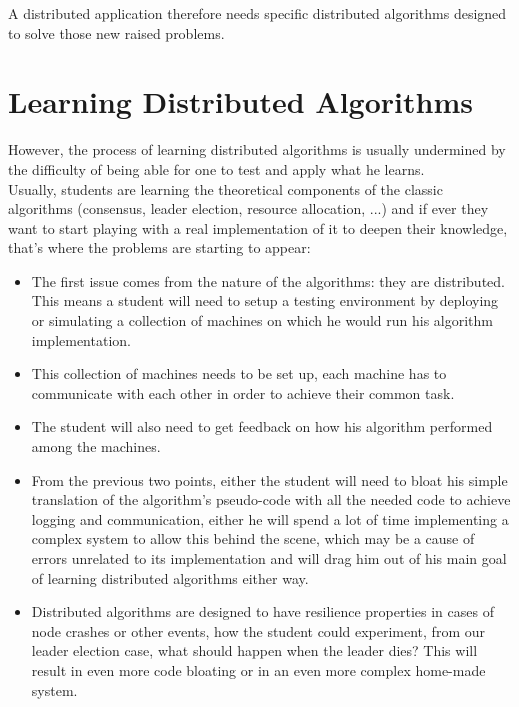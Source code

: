 \documentclass{eplmastersthesis}
\begin{document}
    A distributed application therefore needs specific distributed algorithms
    designed to solve those new raised problems.

    \section{Learning Distributed Algorithms}

      However, the process of learning distributed algorithms
      is usually undermined by the difficulty of being able for one to test
      and apply what he learns.\\
      Usually, students are learning the theoretical components of the
      classic algorithms (consensus, leader election, resource allocation, ...)
      and if ever they want to start playing with a real implementation of it
      to deepen their knowledge, that's where the problems are starting to
      appear:

      \begin{itemize}
        \item The first issue comes from the nature of the algorithms: they are
        distributed. This means a student will need to setup a testing
        environment by deploying or simulating a collection of machines on
        which he would run his algorithm implementation.
        \item This collection of machines needs to be set up, each machine has
        to communicate with each other in order to achieve their common task.
        \item The student will also need to get feedback on how his
        algorithm performed among the machines.
        \item From the previous two points, either the student will need to
        bloat his simple translation of the algorithm's pseudo-code
        with all the needed code to achieve logging and communication, either
        he will spend a lot of time implementing a complex system to allow
        this behind the scene, which may be a cause of errors unrelated to its
        implementation and will drag him out of his main goal of learning
        distributed algorithms either way.
        \item Distributed algorithms are designed to have resilience
        properties in cases of node crashes or other events, how the student
        could experiment, from our leader election case, what should
        happen when the leader dies? This will result in even more code
        bloating or in an even more complex home-made system.
      \end{itemize}
\end{document}
